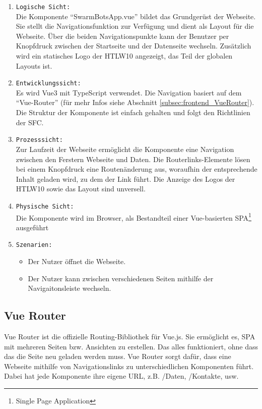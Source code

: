   \begin{enumerate}
    \item \texttt{Logische Sicht:} \\
    Die Komponente ``SwarmBotsApp.vue'' bildet das Grundgerüst der Webseite.
    Sie stellt die Navigationsfunktion zur Verfügung und dient als Layout für die Webseite.
    Über die beiden Navigationspunkte kann der Benutzer per Knopfdruck zwischen der Startseite
    und der Datenseite wechseln.
    Zusätzlich wird ein statisches Logo der HTLW10 angezeigt, das Teil der globalen Layouts ist.
    \item \texttt{Entwicklungssicht:} \\
    Es wird Vue3 mit TypeScript verwendet. 
    Die Navigation basiert auf dem ``Vue-Router'' (für mehr Infos siehe Abschnitt \ref{subsec:frontend_VueRouter}).
    Die Struktur der Komponente ist einfach gehalten und folgt den Richtlinien der SFC. 
    \item \texttt{Prozesssicht:} \\
    Zur Laufzeit der Webseite ermöglicht die Komponente eine Navigation zwischen den Ferstern Webseite und Daten.
    Die Routerlinks-Elemente lösen bei einem Knopfdruck eine Routenänderung aus, 
    woraufhin der entsprechende Inhalt geladen wird, zu dem der Link führt.
    Die Anzeige des Logos der HTLW10 sowie das Layout sind unversell. 
    \item \texttt{Physische Sicht:} \\
    Die Komponente wird im Browser, als Bestandteil einer Vue-basierten SPA\footnote{Single Page Application} ausgeführt
    \item \texttt{Szenarien:} \\
      \begin{itemize}
        \renewcommand{\labelitemi}{$\Rightarrow$}
      \item Der Nutzer öffnet die Webseite.
      \item Der Nutzer kann zwischen verschiedenen Seiten mithilfe der Navigaitonsleiste wechseln.
      \end{itemize}
  \end{enumerate}

\subsection{Vue Router}
\label{subsec:frontend_VueRouter}
Vue Router ist die offizielle Routing-Bibliothek für Vue.js. Sie ermöglicht es, 
SPA mit mehreren Seiten bzw. Ansichten zu erstellen. 
%
Das alles funktioniert, ohne dass das die Seite neu geladen werden muss. 
%
Vue Router sorgt dafür, dass eine Webseite mithilfe von Navigationslinks 
zu unterschiedlichen Komponenten führt. 
Dabei hat jede Komponente ihre eigene URL, z.B. /Daten, /Kontakte, usw.

